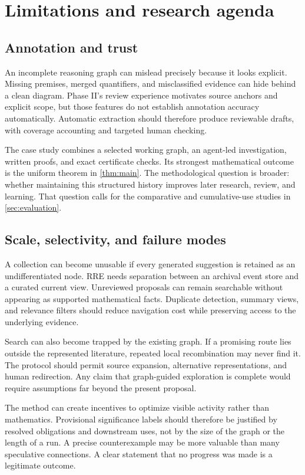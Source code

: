 \section{Limitations and research agenda}\label{sec:discussion}

\subsection{Annotation and trust}

An incomplete reasoning graph can mislead precisely because it looks explicit. Missing premises, merged quantifiers, and misclassified evidence can hide behind a clean diagram. Phase II's review experience motivates source anchors and explicit scope, but those features do not establish annotation accuracy automatically. Automatic extraction should therefore produce reviewable drafts, with coverage accounting and targeted human checking. 

The case study combines a selected working graph, an agent-led investigation, written proofs, and exact certificate checks. Its strongest mathematical outcome is the uniform theorem in \cref{thm:main}. The methodological question is broader: whether maintaining this structured history improves later research, review, and learning. That question calls for the comparative and cumulative-use studies in \cref{sec:evaluation}.

\subsection{Scale, selectivity, and failure modes}

A collection can become unusable if every generated suggestion is retained as an undifferentiated node. RRE needs separation between an archival event store and a curated current view. Unreviewed proposals can remain searchable without appearing as supported mathematical facts. Duplicate detection, summary views, and relevance filters should reduce navigation cost while preserving access to the underlying evidence.

Search can also become trapped by the existing graph. If a promising route lies outside the represented literature, repeated local recombination may never find it. The protocol should permit source expansion, alternative representations, and human redirection. Any claim that graph-guided exploration is complete would require assumptions far beyond the present proposal.

The method can create incentives to optimize visible activity rather than mathematics. Provisional significance labels should therefore be justified by resolved obligations and downstream uses, not by the size of the graph or the length of a run. A precise counterexample may be more valuable than many speculative connections. A clear statement that no progress was made is a legitimate outcome.

